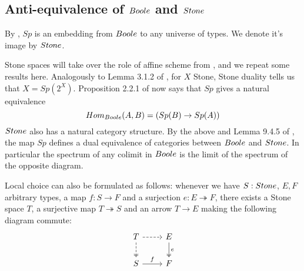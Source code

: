 \subsection{Anti-equivalence of $\Boole$ and $\Stone$}
By , $Sp$ is an embedding from $\Boole$ to any universe of types. 
We denote it's image by $\Stone$. 

\begin{remark}\label{SpIsAntiEquivalence}
Stone spaces will take over the role of affine scheme from \cite{draft}, 
and we repeat some results here. 
Analogously to Lemma 3.1.2 of \cite{draft}, 
for $X$ Stone, Stone duality tells us that $X = Sp(2^X)$. 
%
Proposition 2.2.1 of \cite{draft} now says that 
$Sp$ gives a natural equivalence 
\begin{equation}
   Hom_{\Boole} (A, B) = (Sp(B) \to Sp(A))
\end{equation}
%
$\Stone$ also has a natural category structure.
By the above and Lemma 9.4.5 of \cite{hott}, 
the map $Sp$ defines a dual equivalence of categories between $\Boole$ and $\Stone$.
In particular the spectrum of any colimit in $\Boole$ is the limit of 
the spectrum of the opposite diagram. 
\end{remark}
\begin{remark}
  Local choice can also be formulated as follows:
  whenever we have $S:\Stone$, $E,F$ arbitrary types, a map $f:S \to F$ and a 
  surjection $e:E \twoheadrightarrow F$, 
  there exists a Stone space $T$, a surjective map 
  $T\twoheadrightarrow S$ and an arrow $T\to E$ making the following diagram commute:
    \begin{equation}\begin{tikzcd}
      T \arrow[d,dashed, two heads ] \arrow[r,dashed]&  E \arrow[d,""',two heads, "e"]\\
      S  \arrow[r, "f"] & F
    \end{tikzcd}\end{equation}  
\end{remark}

